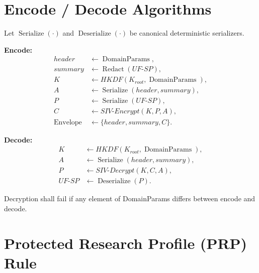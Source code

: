 \section{Encode / Decode Algorithms}

Let $\operatorname{Serialize}(\cdot)$ and $\operatorname{Deserialize}(\cdot)$ be canonical deterministic serializers.

\textbf{Encode:}
\begin{align*}
header &\leftarrow \operatorname{DomainParams},\\
summary &\leftarrow \operatorname{Redact}(UF\mbox{-}SP),\\
K &\leftarrow HKDF(K_{root},\operatorname{DomainParams}),\\
A &\leftarrow \operatorname{Serialize}(header,summary),\\
P &\leftarrow \operatorname{Serialize}(UF\mbox{-}SP),\\
C &\leftarrow SIV\mbox{-}Encrypt(K,P,A),\\
\operatorname{Envelope} &\leftarrow \{header,summary,C\}.
\end{align*}

\textbf{Decode:}
\begin{align*}
K &\leftarrow HKDF(K_{root},\operatorname{DomainParams}),\\
A &\leftarrow \operatorname{Serialize}(header,summary),\\
P &\leftarrow SIV\mbox{-}Decrypt(K,C,A),\\
UF\mbox{-}SP &\leftarrow \operatorname{Deserialize}(P).
\end{align*}

Decryption shall fail if any element of DomainParams differs between encode and decode.

\section{Protected Research Profile (PRP) Rule}

